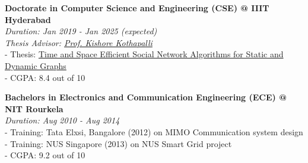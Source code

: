 \textbf{Doctorate in Computer Science and Engineering (CSE) @ IIIT Hyderabad} \\
\emph{Duration: Jan 2019 - Jan 2025 (expected)} \\
\emph{Thesis Advisor: \href{https://faculty.iiit.ac.in/~kkishore/}{Prof. Kishore Kothapalli}} \\
- Thesis: \href{https://puzzlef.github.io}{Time and Space Efficient Social Network Algorithms for Static and Dynamic Graphs} \\
- CGPA: 8.4 out of 10

\noindent
\textbf{Bachelors in Electronics and Communication Engineering (ECE) @ NIT Rourkela} \\
\emph{Duration: Aug 2010 - Aug 2014} \\
- Training: Tata Elxsi, Bangalore (2012) on MIMO Communication system design \\
- Training: NUS Singapore (2013) on NUS Smart Grid project \\
- CGPA: 9.2 out of 10
